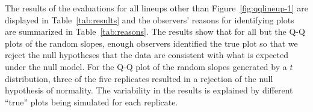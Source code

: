\documentclass[12pt]{article} %
\newcommand{\hh}[1]{{\color{orange} #1}}
\begin{document}
The results of the evaluations for all lineups other than Figure~\ref{fig:qqlineup-1} are displayed in Table~\ref{tab:results} and the observers' reasons for identifying plots are summarized in Table~\ref{tab:reasons}. The results show that for all but the Q-Q plots of the random slopes, enough observers identified the true plot so that we reject the null hypotheses that the data are consistent with what is expected under the null model. For the Q-Q plot of the random slopes generated by a $t$ distribution, three of the five replicates resulted in a rejection of the null hypothesis of normality. The variability in the results is explained by different ``true'' plots being simulated for each replicate. 



\end{document}
